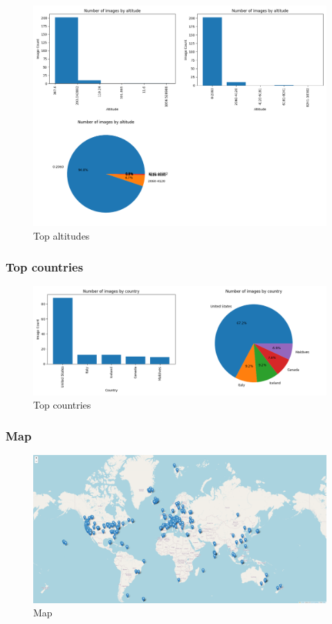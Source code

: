 \documentclass{article}
\begin{document}
    \begin{figure}[htbp]
        \centering
        \includegraphics[width=0.65 \textwidth]{img/altitude}
        \caption{Top altitudes}
        \label{fig:top_altitudes}
    \end{figure}

    \newpage

    \subsubsection{Top countries}\label{subsubsec:top_countries}

    \begin{figure}[htbp]
        \centering
        \includegraphics[width=1.1 \textwidth]{img/country}
        \caption{Top countries}
        \label{fig:top_countries}
    \end{figure}

    \subsubsection{Map}\label{subsubsec:map}

    \begin{figure}[htbp]
        \centering
        \includegraphics[width=1.1 \textwidth]{img/map}
        \caption{Map}
        \label{fig:map}
    \end{figure}
\end{document}
